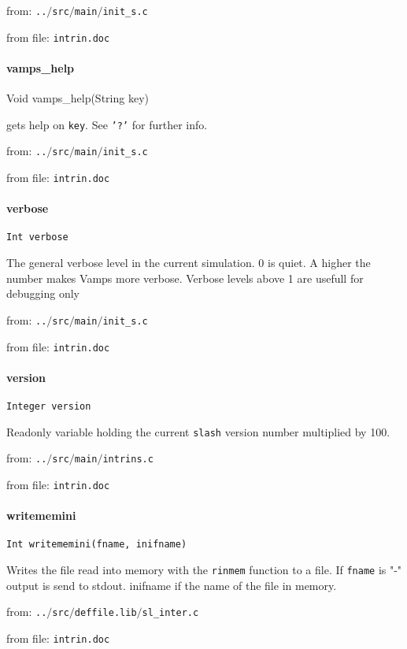 from: {\tt ..$/$src$/$main$/$init\_s.c}

from file: {\tt intrin.doc}


\paragraph{vamps\_help}
Void vamps\_help(String key)


gets help on {\tt key}. See {\tt '?'} for further info.


from: {\tt ..$/$src$/$main$/$init\_s.c}

from file: {\tt intrin.doc}


\paragraph{verbose}
\begin{verbatim}
Int verbose
\end{verbatim}
The general verbose level in the current simulation. 0 is quiet. A
higher the number makes Vamps more verbose. Verbose levels above 1
are usefull for debugging only 


from: {\tt ..$/$src$/$main$/$init\_s.c}

from file: {\tt intrin.doc}


\paragraph{version}
\begin{verbatim}
Integer version
\end{verbatim}
Readonly variable holding the current {\tt slash} version number
multiplied by 100.


from: {\tt ..$/$src$/$main$/$intrins.c}

from file: {\tt intrin.doc}


\paragraph{writememini}
\begin{verbatim}
Int writememini(fname, inifname)
\end{verbatim}
Writes the file read into memory with the {\tt rinmem} function
to a file. If {\tt fname} is "-" output is send to stdout.
inifname if the name of the file in memory.


from: {\tt ..$/$src$/$deffile.lib$/$sl\_inter.c}

from file: {\tt intrin.doc}
